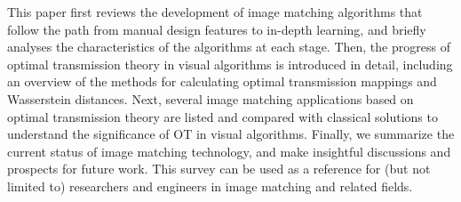 This paper first reviews the development of image matching algorithms that follow the path from manual design features to in-depth 
learning, and briefly analyses the characteristics of the algorithms at each stage. Then, the progress of optimal transmission 
theory in visual algorithms is introduced in detail, including an overview of the methods for calculating optimal transmission 
mappings and Wasserstein distances. Next, several image matching applications based on optimal transmission theory are listed and 
compared with classical solutions to understand the significance of OT in visual algorithms. Finally, we summarize the current 
status of image matching technology, and make insightful discussions and prospects for future work. This survey can be used as a 
reference for (but not limited to) researchers and engineers in image matching and related fields.



